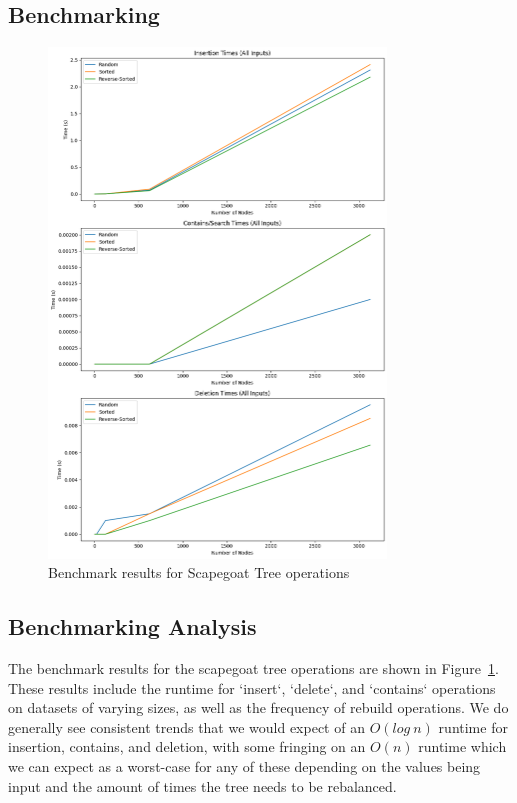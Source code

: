 \documentclass{labReport}
\begin{document}
\subsection{Benchmarking}

\begin{figure}[H]
    \centering
    \includegraphics[width=0.8\textwidth]{benchmarks.png}
    \caption{Benchmark results for Scapegoat Tree operations}
    \label{fig:benchmark}
\end{figure}

\subsection{Benchmarking Analysis}
The benchmark results for the scapegoat tree operations are shown in Figure~\ref{fig:benchmark}. These results include the runtime for `insert`, `delete`, and `contains` operations on datasets of varying sizes, as well as the frequency of rebuild operations. We do generally see consistent trends that we would expect of an $O(log \: n)$ runtime for insertion, contains, and deletion, with some fringing on an $O(n)$ runtime which we can expect as a worst-case for any of these depending on the values being input and the amount of times the tree needs to be rebalanced.


\end{document}
